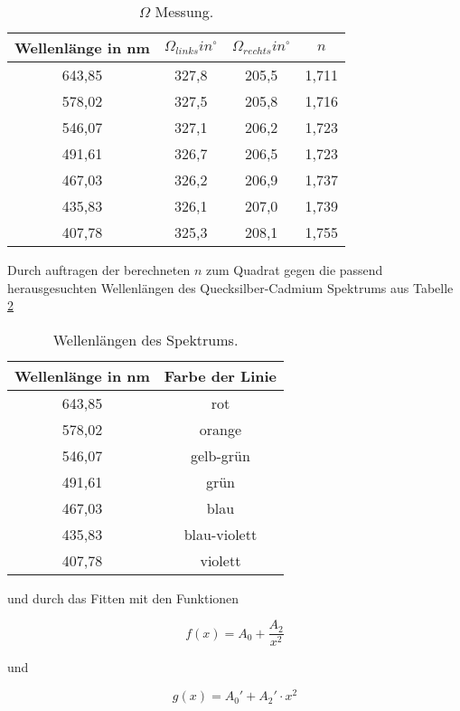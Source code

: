 \begin{table} 
  \centering
  \caption{$\Omega$ Messung.}
  \label{tab:omega}
\begin{tabular}{c c c c}
  \toprule
  Wellenlänge in nm & $\Omega_{links} in ^\circ$ & $\Omega_{rechts} in ^\circ$ & $n$\\ 
  \midrule
  643,85  &  327,8  &  205,5  &  1,711  \\
  578,02  &  327,5  &  205,8  &  1,716  \\
  546,07  &  327,1  &  206,2  &  1,723  \\
  491,61  &  326,7  &  206,5  &  1,723 \\
  467,03  &  326,2  &  206,9  &  1,737 \\
  435,83  &  326,1  &  207,0  &  1,739  \\
  407,78  &  325,3  &  208,1  &  1,755  \\
  \bottomrule
\end{tabular}
\end{table}
\FloatBarrier

Durch auftragen der berechneten $n$ zum Quadrat gegen die passend herausgesuchten Wellenlängen des Quecksilber-Cadmium Spektrums \cite{ref1} aus Tabelle \ref{tab:wellen}

\begin{table}
  \centering
  \caption{Wellenlängen des Spektrums.}
  \label{tab:wellen}
  \begin{tabular}{c c}
    \toprule
    Wellenlänge in nm & Farbe der Linie \\
    \midrule
    643,85 & rot \\
    578,02 & orange \\
    546,07 & gelb-grün \\
    491,61 & grün \\
    467,03 & blau \\
    435,83 & blau-violett \\
    407,78 & violett \\
    \bottomrule 
  \end{tabular}
\end{table}
\FloatBarrier

und durch das Fitten mit den Funktionen

\begin{equation}
  f(x) = A_0 + \frac{A_2}{x^2}
  \label{eqn:glf}
\end{equation}

und 

\begin{equation}
  g(x) = A_0' + A_2' \cdot x^2
  \label{eqn:glg}
\end{equation}

